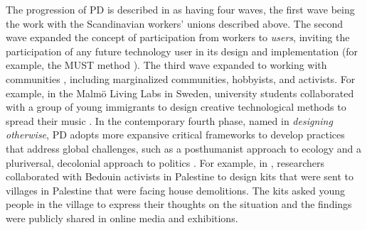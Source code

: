 \documentclass[dissertation,math,vertlayout,pdfa,colorlinks]{aaltoseries}
\begin{document}
The progression of PD is described in \cite{smithRoutledgeInternationalHandbook2025} as having four waves, the first wave being the work with the Scandinavian workers' unions described above. The second wave expanded the concept of participation from workers to \textit{users}, inviting the participation of any future technology user in its design and implementation (for example, the MUST method \cite{bodkerInvestigatingSituatedUse2014}). The third wave expanded to working with communities \cite{disalvoParticipatoryDesignCommunities2012}, including marginalized communities, hobbyists, and activists. For example, in the Malmö Living Labs in Sweden, university students collaborated with a group of young immigrants to design creative technological methods to spread their music \cite{bjorgvinssonAgonisticParticipatoryDesign2012}. In the contemporary fourth phase, named in \cite{smithRoutledgeInternationalHandbook2025} \textit{designing otherwise}, PD adopts more expansive critical frameworks to develop practices that address global challenges, such as a posthumanist approach to ecology \cite{frauenbergerEntanglementHCINext2020,heitlingerAvoidingEcocidalSmart2018} and a pluriversal, decolonial approach to politics \cite{smithPluriversalityDecolonisingDesign2024}. For example, in \cite{clarkeDecolonisingParticipatoryDesign2022}, researchers collaborated with Bedouin activists in Palestine to design kits that were sent to villages in Palestine that were facing house demolitions. The kits asked young people in the village to express their thoughts on the situation and the findings were publicly shared in online media and exhibitions.  
\end{document}

